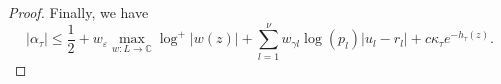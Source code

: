 \documentclass[11pt]{report}
\theoremstyle{definition}
\newcommand{\eps}{\varepsilon}
\begin{document}
\begin{proof}
Finally, we have
\[|\alpha_{\tau}| \leq \frac{1}{2} + w_{\eps} \max_{w :L \to \mathbb{C}}\log^+|w(z)| + \sum_{l = 1}^{\nu}w_{\gamma l} \log(p_l)|u_l - r_l| + c\kappa_{\tau}e^{-h_{\tau}(z)}.\]

%
%
\end{proof}
\end{document}
